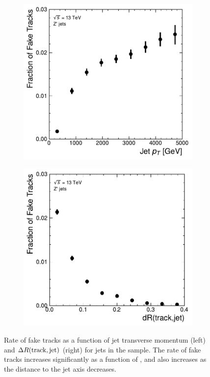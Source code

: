 \begin{figure}[!htbp]
  \centering
  \begin{subfigure}[b]{0.48\textwidth}
      \centering
      \includegraphics[width=\textwidth]{chapters/4.track_classifier/figs/fake_vs_pt.pdf}
  \end{subfigure}
  \quad
  \begin{subfigure}[b]{0.48\textwidth}
      \centering
      \includegraphics[width=\textwidth]{chapters/4.track_classifier/figs/fake_vs_dr.pdf}
  \end{subfigure}
  \caption{
    Rate of fake tracks as a function of jet transverse momentum (left) and $\Delta R(\textnormal{track}, \textnormal{jet})$ (right) for jets in the \Zprime sample.
    The rate of fake tracks increases significantly as a function of \pt, and also increases as the distance to the jet axis decreases.
  }
  \label{fig:fakerate_vs}
\end{figure}

